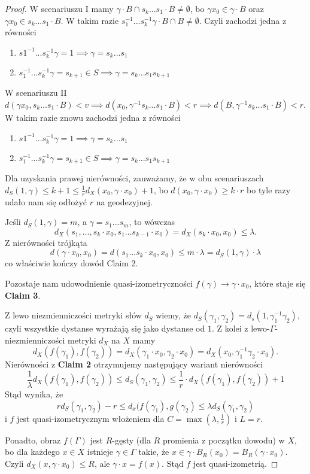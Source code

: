 \begin{proof}

  W scenariuszu I mamy $\gamma\cdot B\cap s_k...s_1 \cdot B\neq\emptyset$, bo $\gamma x_0\in \gamma\cdot B$ oraz $\gamma x_0\in s_k...s_1\cdot B$. W takim razie $s_1^{-1}...s_k^{-1}\gamma\cdot B\cap B\neq\emptyset$. Czyli zachodzi jedna z równości
  \begin{enumerate}
    \item $s1^{-1}...s_k^{-1}\gamma=1\implies \gamma=s_k...s_1$
    \item $s_1^{-1}...s_k^{-1}\gamma=s_{k+1}\in S\implies \gamma=s_k...s_1s_{k+1}$
  \end{enumerate}

  W scenariuszu II $d(\gamma x_0, s_k...s_1\cdot B)<v\implies d(x_0,\gamma^{-1}s_k...s_1\cdot B)<r\implies d(B, \gamma^{-1}s_k...s_1\cdot B)<r$. W takim razie znowu zachodzi jedna z równości
  \begin{enumerate}
    \item $s1^{-1}...s_k^{-1}\gamma=1\implies \gamma=s_k...s_1$
    \item $s_1^{-1}...s_k^{-1}\gamma=s_{k+1}\in S\implies \gamma=s_k...s_1s_{k+1}$
  \end{enumerate}

  Dla uzyskania prawej nierówności, zauważamy, że w obu scenariuszach 
  $d_S(1,\gamma)\leq k+1\leq \frac{1}{r}d_X(x_0,\gamma\cdot x_0)+1$, bo $d(x_0, \gamma\cdot x_0)\geq k\cdot r$ bo tyle razy udało nam się odłożyć $r$ na geodezyjnej.

  Jeśli $d_S(1,\gamma)=m$, a $\gamma=s_1...s_m$, to wówczas
  $$d_X(s_1,...,s_k\cdot x_0,s_1...s_{k-1}\cdot x_0)=d_X(s_k\cdot x_0,x_0)\leq \lambda.$$
  Z nierówności trójkąta 
  $$d(\gamma\cdot x_0,x_0)=d(s_1...s_k\cdot x_0,x_0)\leq m\cdot \lambda=d_S(1,\gamma)\cdot\lambda$$
  co właściwie kończy dowód Claim 2. 

  Pozostaje nam udowodnienie quasi-izometryczności $f(\gamma)\to \gamma\cdot x_0$, które staje się \textbf{Claim 3}.

  Z lewo niezmienniczości metryki słów $d_S$ wiemy, że $d_S(\gamma_1, \gamma_2)=d_s(1, \gamma_1^{-1}\gamma_2)$, czyli wszystkie dystanse wyrażają się jako dystanse od $1$. Z kolei z lewo-$\Gamma$-niezmienniczości metryki $d_X$ na $X$ mamy 
  $$d_X(f(\gamma_1), f(\gamma_2))=d_X(\gamma_1\cdot x_0,\gamma_2\cdot x_0)=d_X(x_0,\gamma_1^{-1}\gamma_2\cdot x_0).$$
  Nierówności z \textbf{Claim 2} otrzymujemy następujący wariant nierówności
  $$\frac{1}{\lambda}d_X(f(\gamma_1), f(\gamma_2))\leq d_S(\gamma_1,\gamma_2)\leq \frac{1}{r}\cdot d_X(f(\gamma_1), f(\gamma_2))+1$$
  Stąd wynika, że 
  $$r d_S(\gamma_1,\gamma_2)-r\leq d_x(f(\gamma_1),g(\gamma_2)\leq \lambda d_S(\gamma_1,\gamma_2)$$
  i $f$ jest quasi-izometrycznym włożeniem dla $C=\max(\lambda, \frac{1}{r})$ i $L=r$.

  Ponadto, obraz $f(\Gamma)$ jest $R$-gęsty (dla $R$ promienia z początku dowodu) w $X$, bo dla każdego $x\in X$ istnieje $\gamma\in\Gamma$ takie, że $x\in\gamma\cdot B_R(x_0)=B_R(\gamma\cdot x_0)$. Czyli $d_X(x, \gamma\cdot x_0)\leq R$, ale $\gamma\cdot x=f(x)$. Stąd $f$ jest quasi-izometrią.
\end{proof}

